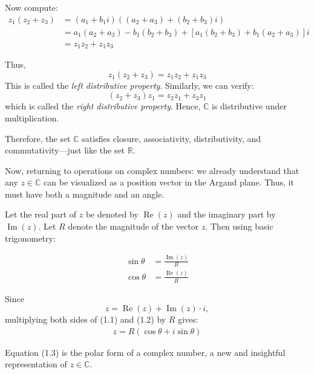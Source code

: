 Now compute:
\begin{align*}
z_1 (z_2 + z_3) &= (a_1 + b_1 i)((a_2 + a_3) + (b_2 + b_3)i) \\
&= a_1(a_2 + a_3) - b_1(b_2 + b_3) + [a_1(b_2 + b_3) + b_1(a_2 + a_3)]i \\
&= z_1 z_2 + z_1 z_3
\end{align*}

Thus,
\[
z_1(z_2 + z_3) = z_1 z_2 + z_1 z_3
\]
This is called the \emph{left distributive property}. Similarly, we can verify:
\[
(z_2 + z_3)z_1 = z_2 z_1 + z_3 z_1
\]
which is called the \emph{right distributive property}. Hence, $\mathbb{C}$ is distributive under multiplication.

Therefore, the set $\mathbb{C}$ satisfies closure, associativity, distributivity, and commutativity—just like the set $\mathbb{R}$.

Now, returning to operations on complex numbers: we already understand that any $z \in \mathbb{C}$ can be visualized as a position vector in the Argand plane. Thus, it must have both a magnitude and an angle.

\begin{center}
\end{center}

Let the real part of $z$ be denoted by $\operatorname{Re}(z)$ and the imaginary part by $\operatorname{Im}(z)$. Let $R$ denote the magnitude of the vector $z$. Then using basic trigonometry:

\begin{align}
\sin \theta &= \frac{\operatorname{Im}(z)}{R} \tag{1.1} \\
\cos \theta &= \frac{\operatorname{Re}(z)}{R} \tag{1.2}
\end{align}

Since
\[
z = \operatorname{Re}(z) + \operatorname{Im}(z) \cdot i,
\]
multiplying both sides of (1.1) and (1.2) by $R$ gives:
\begin{align}
z = R\left( \cos \theta + i \sin \theta \right) \tag{1.3}
\end{align}

Equation (1.3) is the polar form of a complex number, a new and insightful representation of $z \in \mathbb{C}$.

